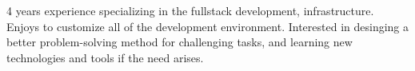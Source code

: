 

\begin{cvparagraph}

4 years experience specializing in the fullstack development, infrastructure. Enjoys to customize all of the development environment. Interested in desinging a better problem-solving method for challenging tasks, and learning new technologies and tools if the need arises.
\end{cvparagraph}
